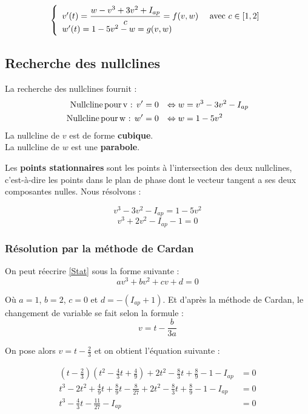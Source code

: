 \documentclass[12pt,a4paper,onecolumn]{article}
\begin{document}
\begin{equation}
\left\{
\begin{array}{l l}
v'(t)= \displaystyle{\frac{w - v^3 + 3v^2 +I_{ap}}{c}} = f(v,w) & \text{ avec } c\in [1, 2]\\
w'(t) = 1 - 5 v^2 - w = g(v,w) & \\
\end{array}
\right.
\end{equation}

\subsection{Recherche des nullclines}

La recherche des nullclines fournit :
\begin{align*}
\text{Nullcline\,pour\,v : } v' &= 0  &\Leftrightarrow w &= v^3 - 3 v^2 - I_{ap}\\
\text{Nullcline\,pour\,w : } w' &= 0 &\Leftrightarrow w &= 1-5v^2
\end{align*}
La nullcline de $v$ est de forme \textbf{cubique}. \\
La nullcline de $w$ est une \textbf{parabole}.

Les \textbf{points stationnaires} sont les points à l'intersection des deux nullclines, c'est-à-dire les points dans le plan de phase dont le vecteur tangent a ses deux composantes nulles. Nous résolvons :

$$
v^3 - 3 v^2 - I_{ap} = 1-5v^2
$$
\begin{equation} \label{Stat}
v^3 + 2v^2 -I_{ap} -1 = 0
\end{equation}



\subsubsection{Résolution par la méthode de Cardan}
On peut réecrire \ref{Stat} sous la forme suivante :
\begin{equation*}
av^3 + b v^2 + cv + d = 0
\end{equation*}

Où $a = 1$, $b = 2$, $c = 0$ et $d = -(I_{ap} + 1)$.
Et d'après la méthode de Cardan, le changement de variable se fait selon la formule : $$ v=t-\frac{b}{3a} $$

On pose alors $v = t - \frac{2}{3}$ et on obtient l'équation suivante :

\begin{align}
\left(t - \frac{2}{3}\right)\left(t^2 - \frac{4}{3}t + \frac{4}{9}\right) + 2t^2 - \frac{8}{3}t + \frac{8}{9} - 1 - I_{ap} &= 0 \nonumber\\
t^3 - 2t^2 + \frac{4}{9}t + \frac{8}{9}t - \frac{8}{27} +2t^2 - \frac{8}{3}t + \frac{8}{9} - 1 - I_{ap} &= 0 \nonumber\\
t^3 - \frac{4}{3}t - \frac{11}{27} - I_{ap} &= 0 \label{eqCadran}
\end{align}
\end{document}
